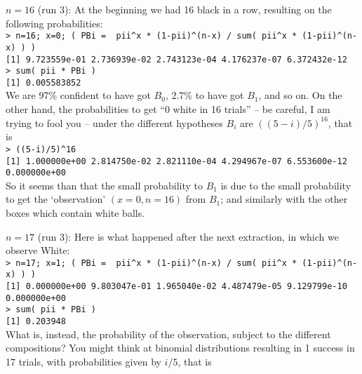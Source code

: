 \documentclass[11pt]{article}
\begin{document}
\begin{description}
\item{$n=16$ (run 3):} At the beginning we had 16 black in a row, 
              resulting on the following probabilities:\\
{\small 
              \verb|> n=16; x=0; ( PBi =  pii^x * (1-pii)^(n-x) / sum( pii^x * (1-pii)^(n-x) ) )|\\
              \verb|[1] 9.723559e-01 2.736939e-02 2.743123e-04 4.176237e-07 6.372432e-12|\\
              \verb|> sum( pii * PBi )|\\
              \verb|[1] 0.005583852| \\
}
              We are 97\% confident to have got $B_0$, 
              2.7\% to have got $B_1$, and so on. On the other hand,
              the probabilities to get ``0 white in 16 trials'' -- be careful,
              I am trying to fool you -- under the different hypotheses $B_i$
              are $((5-i)/5)^{16}$, that is\\
              {\small 
              \verb|> ((5-i)/5)^16|\\
              \verb|[1] 1.000000e+00 2.814750e-02 2.821110e-04 4.294967e-07 6.553600e-12 0.000000e+00| 
              }\\ 
              So it seems than that the small probability to $B_1$ is 
              due to the small probability to get the `observation' 
              $(x=0,n=16)$ from $B_1$; and similarly with the other
              boxes which contain white balls. 
\item{$n=17$ (run 3):}
              Here is what happened after the next extraction, in which
              we observe White:\\
              {\small 
              \verb|> n=17; x=1; ( PBi =  pii^x * (1-pii)^(n-x) / sum( pii^x * (1-pii)^(n-x) ) )|\\
              \verb|[1] 0.000000e+00 9.803047e-01 1.965040e-02 4.487479e-05 9.129799e-10  0.000000e+00|\\
              \verb|> sum( pii * PBi )|\\
              \verb|[1] 0.203948|
              }\\
              What is, instead, the probability of the observation, subject
              to the different compositions? 
              You might think at binomial distributions resulting in 1 success
              in 17 trials, with probabilities given by $i/5$, that is\\

\end{description}
\end{document}
